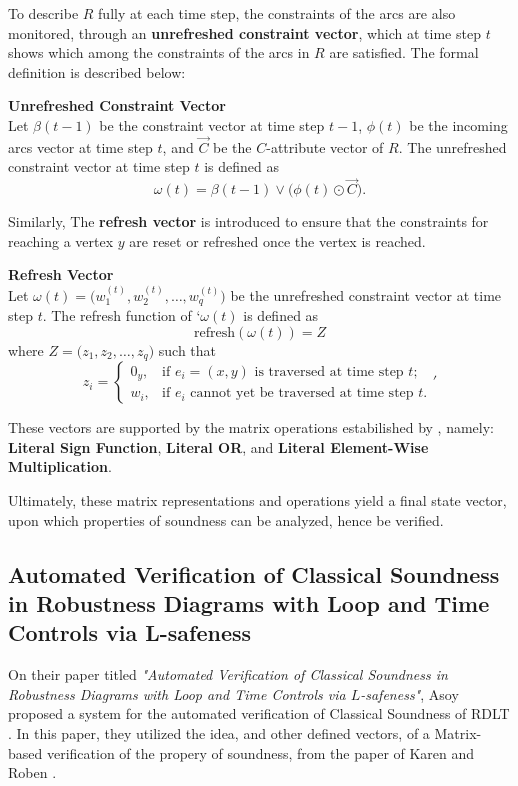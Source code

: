     To describe $R$ fully at each time step, the constraints of the arcs are also monitored, through an \textbf{unrefreshed constraint vector}, which at time step $t$ shows which among the constraints of the arcs in $R$ are satisfied. The formal definition is described below:

    \begin{defn} \textbf{Unrefreshed Constraint Vector} \cite{KarenRoben2018} \\
        Let $\beta(t-1)$ be the constraint vector at time step $t-1$, $\phi(t)$ be the incoming arcs vector at time step $t$, and $\vec{C}$ be the $C$-attribute vector of $R$. The unrefreshed constraint vector at time step $t$ is defined as
        \[
        \omega(t) = \beta(t-1) \lor \big(\phi(t) \odot \vec{C}\big).
        \]       
    \end{defn}
    
    Similarly, The \textbf{refresh vector} is introduced to ensure that the constraints for reaching a vertex $y$ are reset or refreshed once the vertex is reached. 
    \begin{defn} \textbf{Refresh Vector} \cite{KarenRoben2018} \\
        Let $\omega(t) = \big(w_1^{(t)}, w_2^{(t)}, \dots, w_q^{(t)}\big)$ be the unrefreshed constraint vector at time step $t$. The refresh function of `$\omega(t)$ is defined as
        \[
        \text{refresh}(\omega(t)) = Z
        \]
        where $Z = \big(z_1, z_2, \dots, z_q\big)$ such that
        \[
        z_i =
        \begin{cases}
        0_y, & \text{if } e_i = (x, y) \text{ is traversed at time step } t; \\
        w_i, & \text{if } e_i \text{ cannot yet be traversed at time step } t.
        \end{cases}'
        \]
    \end{defn}
    
    These vectors are supported by the matrix operations estabilished by \cite{KarenRoben2018}, namely: \textbf{Literal Sign Function}, \textbf{Literal OR}, and \textbf{Literal Element-Wise Multiplication}.

    Ultimately, these matrix representations and operations yield a final state vector, upon which properties of soundness can be analyzed, hence be verified.

    \subsection*{Automated Verification of Classical Soundness in Robustness Diagrams with Loop and Time Controls via L-safeness}
    On their paper titled \textit{"Automated Verification of Classical Soundness in Robustness Diagrams with Loop and Time Controls via $L$-safeness"}, Asoy \cite{Asoy2024} proposed a system for the automated verification of Classical Soundness of RDLT \cite{MalinaoPJS2023}. In this paper, they utilized the idea, and other defined vectors, of a Matrix-based verification of the propery of soundness, from the paper of Karen and Roben \cite{KarenRoben2018}. \\
    
